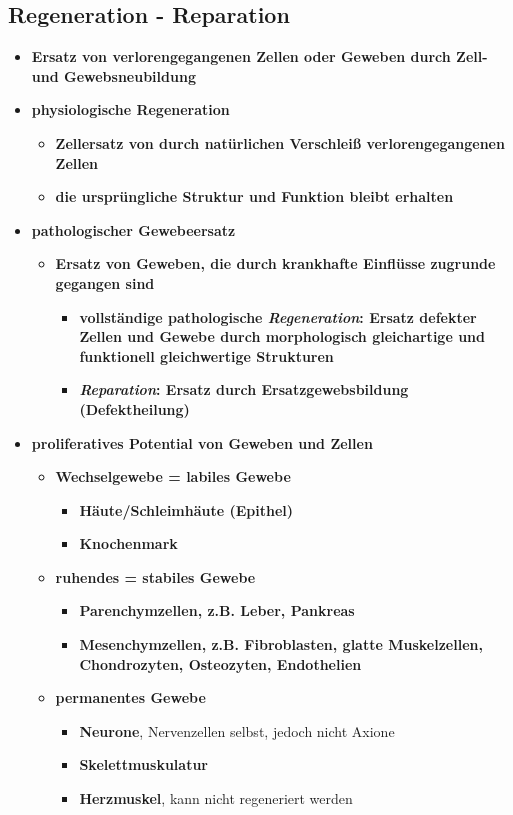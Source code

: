 \subsection{Regeneration - Reparation}
	\begin{itemize}
		\item \textbf{Ersatz von verlorengegangenen Zellen oder Geweben durch Zell- und Gewebsneubildung}
		\item \textbf{physiologische Regeneration}
			\begin{itemize}
				\item \textbf{Zellersatz von durch natürlichen Verschleiß verlorengegangenen Zellen}
				\item \textbf{die ursprüngliche Struktur und Funktion bleibt erhalten}
			\end{itemize}
		\item \textbf{pathologischer Gewebeersatz}
			\begin{itemize}
				\item \textbf{Ersatz von Geweben, die durch krankhafte Einflüsse zugrunde gegangen sind}
					\begin{itemize}
						\item \textbf{vollständige pathologische \emph{Regeneration}: Ersatz defekter Zellen und Gewebe durch morphologisch gleichartige und funktionell gleichwertige Strukturen}
						\item \textbf{\emph{Reparation}: Ersatz durch Ersatzgewebsbildung (Defektheilung)}
					\end{itemize}
			\end{itemize}
		\item \textbf{proliferatives Potential von Geweben und Zellen}
			\begin{itemize}
				\item \textbf{Wechselgewebe = labiles Gewebe}
					\begin{itemize}
						\item \textbf{Häute/Schleimhäute (Epithel)}
						\item \textbf{Knochenmark}
					\end{itemize}
				\item \textbf{ruhendes = stabiles Gewebe}
					\begin{itemize}
						\item \textbf{Parenchymzellen, z.B. Leber, Pankreas}
						\item \textbf{Mesenchymzellen, z.B. Fibroblasten, glatte Muskelzellen, Chondrozyten, Osteozyten, Endothelien}
					\end{itemize}
				\item \textbf{permanentes Gewebe}
					\begin{itemize}
						\item \textbf{Neurone}, Nervenzellen selbst, jedoch nicht Axione
						\item \textbf{Skelettmuskulatur}
						\item \textbf{Herzmuskel}, kann nicht regeneriert werden
					\end{itemize}
			\end{itemize}
	\end{itemize}
\pagebreak
